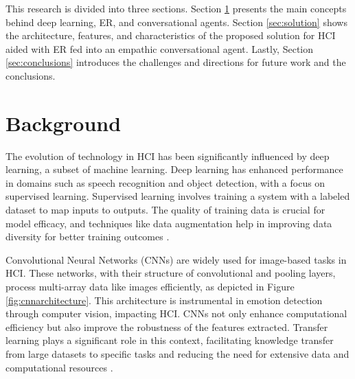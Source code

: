 \documentclass[runningheads]{llncs}
\begin{document}
This research is divided into three sections. Section \ref{sec:background} presents the main concepts behind deep learning, ER, and conversational agents. Section \ref{sec:solution} shows the architecture, features, and characteristics of the proposed solution for HCI aided with ER fed into an empathic conversational agent. Lastly, Section \ref{sec:conclusions}  introduces the challenges and directions for future work and the conclusions. 

\section{Background}
\label{sec:background}

The evolution of technology in HCI has been significantly influenced by deep learning, a subset of machine learning. Deep learning has enhanced performance in domains such as speech recognition and object detection, with a focus on supervised learning. Supervised learning involves training a system with a labeled dataset to map inputs to outputs. The quality of training data is crucial for model efficacy, and techniques like data augmentation help in improving data diversity for better training outcomes \cite{Alrowais2023,Lecun2015}.

Convolutional Neural Networks (CNNs) are widely used for image-based tasks in HCI. These networks, with their structure of convolutional and pooling layers, process multi-array data like images efficiently, as depicted in Figure \ref{fig:cnnarchitecture}. This architecture is instrumental in emotion detection through computer vision, impacting HCI. CNNs not only enhance computational efficiency but also improve the robustness of the features extracted. Transfer learning plays a significant role in this context, facilitating knowledge transfer from large datasets to specific tasks and reducing the need for extensive data and computational resources \cite{Lecun2015, Khan2020}.
\end{document}
